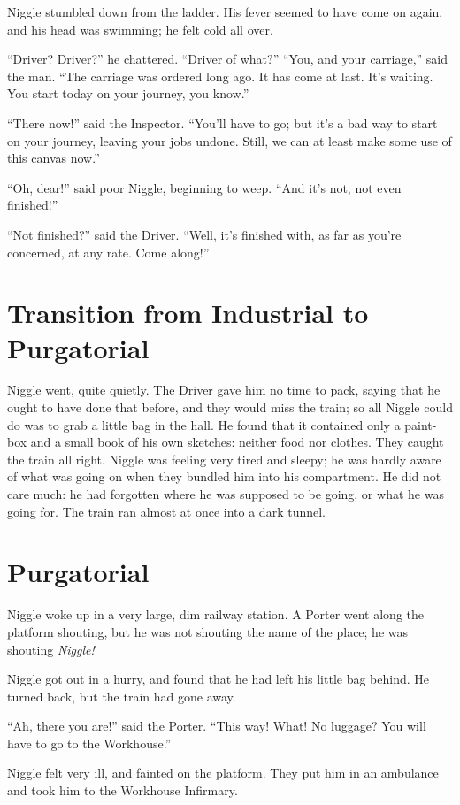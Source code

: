 \documentclass[english]{scrartcl}
\begin{document}
Niggle stumbled down from the ladder. His fever seemed to have come on again, and his head was swimming; he felt cold all over.

“Driver? Driver?” he chattered. “Driver of what?” “You, and your carriage,” said the man. “The carriage was ordered long ago. It has come at last. It’s waiting. You start today on your journey, you know.”

“There now!” said the Inspector. “You’ll have to go; but it’s a bad way to start on your journey, leaving your jobs undone. Still, we can at least make some use of this canvas now.”

“Oh, dear!” said poor Niggle, beginning to weep. “And it’s not, not even finished!”

“Not finished?” said the Driver. “Well, it’s finished with, as far as you’re concerned, at any rate. Come along!”

\section*{Transition from Industrial to Purgatorial}

Niggle went, quite quietly. The Driver gave him no time to pack, saying that he ought to have done that before, and they would miss the train; so all Niggle could do was to grab a little bag in the hall. He found that it contained only a paint-box and a small book of his own sketches: neither food nor clothes. They caught the train all right. Niggle was feeling very tired and sleepy; he was hardly aware of what was going on when they bundled him into his compartment. He did not care much: he had forgotten where he was supposed to be going, or what he was going for. The train ran almost at once into a dark tunnel.

\section*{Purgatorial}

Niggle woke up in a very large, dim railway station. A Porter went along the platform shouting, but he was not shouting the name of the place; he was shouting \emph{Niggle!}

Niggle got out in a hurry, and found that he had left his little bag behind. He turned back, but the train had gone away.

“Ah, there you are!” said the Porter. “This way! What! No luggage? You will have to go to the Workhouse.”

Niggle felt very ill, and fainted on the platform. They put him in an ambulance and took him to the Workhouse Infirmary.
\end{document}
